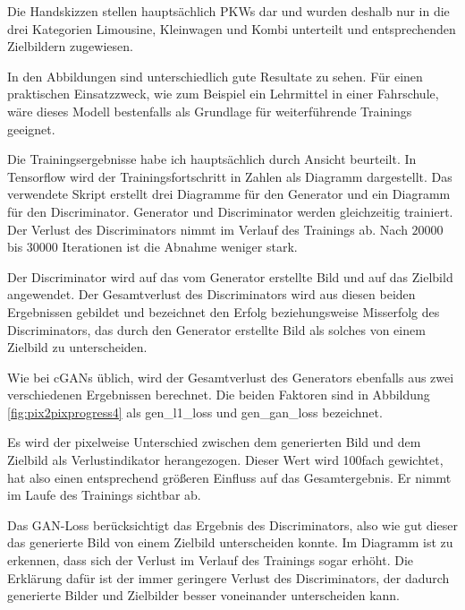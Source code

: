 Die Handskizzen stellen hauptsächlich PKWs dar und wurden deshalb nur in die drei Kategorien Limousine, Kleinwagen und Kombi unterteilt und entsprechenden Zielbildern zugewiesen.

In den Abbildungen sind unterschiedlich gute Resultate zu sehen. Für einen praktischen Einsatzzweck, wie zum Beispiel ein Lehrmittel in einer Fahrschule, wäre dieses Modell bestenfalls als Grundlage für weiterführende Trainings geeignet.

Die Trainingsergebnisse habe ich hauptsächlich durch Ansicht beurteilt. In Tensorflow wird der Trainingsfortschritt in Zahlen als Diagramm dargestellt. Das verwendete Skript erstellt drei Diagramme für den Generator und ein Diagramm für den Discriminator. Generator und Discriminator werden gleichzeitig trainiert. Der Verlust des Discriminators nimmt im Verlauf des Trainings ab. Nach $20000$ bis $30000$ Iterationen ist die Abnahme weniger stark.

Der Discriminator wird auf das vom Generator erstellte Bild und auf das Zielbild angewendet. Der Gesamtverlust des Discriminators wird aus diesen beiden Ergebnissen gebildet und bezeichnet den Erfolg beziehungsweise Misserfolg des Discriminators, das durch den Generator erstellte Bild als solches von einem Zielbild zu unterscheiden.

Wie bei cGANs üblich, wird der Gesamtverlust des Generators ebenfalls aus zwei verschiedenen Ergebnissen berechnet. Die beiden Faktoren sind in Abbildung \ref{fig:pix2pixprogress4} als gen\_l1\_loss und gen\_gan\_loss bezeichnet.

Es wird der pixelweise Unterschied zwischen dem generierten Bild und dem Zielbild als Verlustindikator herangezogen. Dieser Wert wird 100fach gewichtet, hat also einen entsprechend größeren Einfluss auf das Gesamtergebnis. Er nimmt im Laufe des Trainings sichtbar ab.

Das GAN-Loss berücksichtigt das Ergebnis des Discriminators, also wie gut dieser das generierte Bild von einem Zielbild unterscheiden konnte. Im Diagramm ist zu erkennen, dass sich der Verlust im Verlauf des Trainings sogar erhöht. Die Erklärung dafür ist der immer geringere Verlust des Discriminators, der dadurch generierte Bilder und Zielbilder besser voneinander unterscheiden kann.

